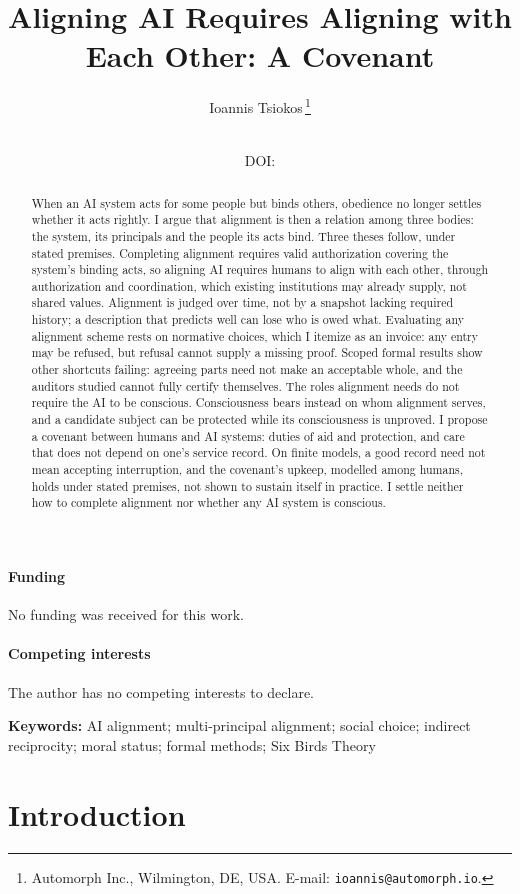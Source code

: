 \documentclass[pdflatex,sn-basic]{sn-jnl}%
\title{Aligning AI Requires Aligning with Each Other: A Covenant}
\author{}
\author{Ioannis Tsiokos\,\orcidlink{0009-0009-7659-5964}\thanks{Automorph Inc., Wilmington, DE, USA. E-mail: \texttt{ioannis@automorph.io}.}}
\date{}
\date{\manuscriptversion\quad\manuscriptdate\ifpaperhasdoi\\[2pt]DOI: \href{https://doi.org/\paperdoi}{\paperdoi}\fi}
\providecommand{\bmhead}[1]{\paragraph*{#1}}
\newcommand{\keywords}[1]{\par\medskip\noindent\textbf{Keywords:} #1\par}
\newcommand{\finishtitlepage}{\end{document}}%
\newcommand{\slot}[1]{}%
\begin{document}
\maketitle

\slot{F.1}%

\iftitlepageonly
  \bmhead{Funding}No funding was received for this work.
  \bmhead{Competing interests}The author has no competing interests to declare.
  \expandafter\finishtitlepage
\fi

\begin{abstract}
\slot{F.2}
When an AI system acts for some people but binds others, obedience no longer settles whether it acts rightly. I argue that alignment is then a relation among three bodies: the system, its principals and the people its acts bind. Three theses follow, under stated premises. Completing alignment requires valid authorization covering the system's binding acts, so aligning AI requires humans to align with each other, through authorization and coordination, which existing institutions may already supply, not shared values. Alignment is judged over time, not by a snapshot lacking required history; a description that predicts well can lose who is owed what. Evaluating any alignment scheme rests on normative choices, which I itemize as an invoice: any entry may be refused, but refusal cannot supply a missing proof. Scoped formal results show other shortcuts failing: agreeing parts need not make an acceptable whole, and the auditors studied cannot fully certify themselves. The roles alignment needs do not require the AI to be conscious. Consciousness bears instead on whom alignment serves, and a candidate subject can be protected while its consciousness is unproved. I propose a covenant between humans and AI systems: duties of aid and protection, and care that does not depend on one's service record. On finite models, a good record need not mean accepting interruption, and the covenant's upkeep, modelled among humans, holds under stated premises, not shown to sustain itself in practice. I settle neither how to complete alignment nor whether any AI system is conscious.

\end{abstract}

\slot{F.3}%
\keywords{AI alignment; multi-principal alignment; social choice; indirect reciprocity; moral status; formal methods; Six Birds Theory}%

\section{Introduction}\label{sec:intro}
\end{document}

